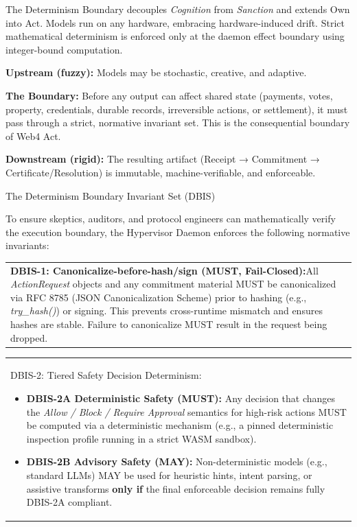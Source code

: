 \documentclass[
  11pt,
]{article}
\providecommand{\tightlist}{%
  \setlength{\itemsep}{0pt}\setlength{\parskip}{0pt}}
\begin{document}
The Determinism Boundary decouples \emph{Cognition} from \emph{Sanction}
and extends Own into Act. Models run on any hardware, embracing
hardware-induced drift. Strict mathematical determinism is enforced only
at the daemon effect boundary using integer-bound computation.

\textbf{Upstream (fuzzy):} Models may be stochastic, creative, and
adaptive.

\textbf{The Boundary:} Before any output can affect shared state
(payments, votes, property, credentials, durable records, irreversible
actions, or settlement), it must pass through a strict, normative
invariant set. This is the consequential boundary of Web4 Act.

\textbf{Downstream (rigid):} The resulting artifact (Receipt →
Commitment → Certificate/Resolution) is immutable, machine-verifiable,
and enforceable.

The Determinism Boundary Invariant Set (DBIS)

To ensure skeptics, auditors, and protocol engineers can mathematically
verify the execution boundary, the Hypervisor Daemon enforces the following
normative invariants:

\hfill\break

\begin{longtable}[]{@{}>{\raggedright\arraybackslash}p{\linewidth}@{}}
\toprule\noalign{}
 \\
\midrule\noalign{}
\endhead
\bottomrule\noalign{}
\endlastfoot
\textbf{DBIS-1: Canonicalize-before-hash/sign (MUST, Fail-Closed):}All
\emph{ActionRequest} objects and any commitment material MUST be
canonicalized via RFC 8785 (JSON Canonicalization Scheme) prior to
hashing (e.g., \emph{try\_hash()}) or signing. This prevents
cross-runtime mismatch and ensures hashes are stable. Failure to
canonicalize MUST result in the request being dropped. \\
\end{longtable}

\begin{longtable}[]{@{}
  >{\raggedright\arraybackslash}p{}@{}}
\toprule\noalign{}
 \\
\midrule\noalign{}
\endhead
\bottomrule\noalign{}
\endlastfoot
DBIS-2: Tiered Safety Decision Determinism:

\begin{itemize}
\tightlist
\item
  \textbf{DBIS-2A Deterministic Safety (MUST):} Any decision that
  changes the \emph{Allow / Block / Require Approval} semantics for
  high-risk actions MUST be computed via a deterministic mechanism
  (e.g., a pinned deterministic inspection profile running in a strict
  WASM sandbox).
\item
  \textbf{DBIS-2B Advisory Safety (MAY):} Non-deterministic models
  (e.g., standard LLMs) MAY be used for heuristic hints, intent parsing,
  or assistive transforms \textbf{only if} the final enforceable
  decision remains fully DBIS-2A compliant.
\end{itemize} \\
\end{longtable}
\end{document}
